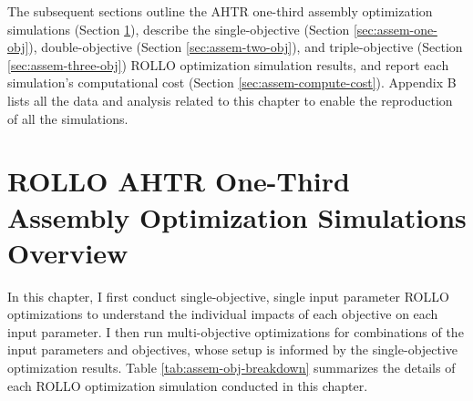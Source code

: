 The subsequent sections outline the \gls{AHTR} one-third assembly optimization 
simulations (Section \ref{sec:assem-overview}), describe the single-objective 
(Section \ref{sec:assem-one-obj}), double-objective (Section \ref{sec:assem-two-obj}), 
and triple-objective (Section \ref{sec:assem-three-obj}) \gls{ROLLO} optimization 
simulation results, and report each simulation's computational cost 
(Section \ref{sec:assem-compute-cost}).
Appendix B lists all the data and analysis related to this chapter to enable the 
reproduction of all the simulations.

\section{ROLLO AHTR One-Third Assembly Optimization Simulations Overview}
\label{sec:assem-overview}
In this chapter, I first conduct single-objective, single input parameter 
\gls{ROLLO} optimizations to understand the individual impacts of each objective on each 
input parameter. 
I then run multi-objective optimizations for combinations of the input parameters 
and objectives, whose setup is informed by the single-objective optimization results.
Table \ref{tab:assem-obj-breakdown} summarizes the details of each \gls{ROLLO} 
optimization simulation conducted in this chapter.
